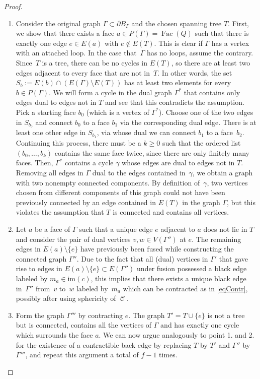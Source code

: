 \documentclass[10pt,a4paper]{amsart}
\DeclareMathOperator{\calc}{\mathcal{C}}
\DeclareMathOperator{\Fac}{\mathrm{Fac}}
\numberwithin{equation}{section}
\theoremstyle{definition}
\begin{document}
\begin{proof}
 \begin{enumerate}\itemsep=0pt
 \item Consider the original graph $\Gamma \subset \partial B_{\Gamma}$ and the chosen spanning tree $T$. First, we show that there exists a face $a \in P(\Gamma) =\Fac(Q)$ such that there is exactly one edge $e \in E(a)$ with $e \notin E(T)$. This is clear if $\Gamma$ has a vertex with an attached loop. In the case that~$\Gamma$ has no loops, assume the contrary. Since~$T$ is a tree, there can be no cycles in $E(T)$, so there are at least two edges adjacent to every face that are not in~$T$. In other words, the set $S_b := E(b) \cap \left(E(\Gamma)\setminus E(T)\right)$ has at least two elements for every $b \in P(\Gamma)$. We will form a cycle in the dual graph $\Gamma^*$ that contains only edges dual to edges not in $T$ and see that this contradicts the assumption. Pick a starting face $b_0$ (which is a vertex of $\Gamma^*$). Choose one of the two edges in $S_{b_0}$ and connect $b_0$ to a face $b_1$ via the corresponding dual edge. There is at least one other edge in $S_{b_1}$, via whose dual we can connect $b_1$ to a face~$b_2$. Continuing this process, there must be a $k \geq 0$ such that the ordered list $(b_0, \dots, b_k)$ contains the same face twice, since there are only finitely many faces. Then, $\Gamma^*$ contains a cycle $\gamma$ whose edges are dual to edges not in $T$. Removing all edges in $\Gamma$ dual to the edges contained in~$\gamma$, we obtain a graph with two nonempty connected components. By definition of~$\gamma$, two vertices chosen from different components of this graph could not have been previously connected by an edge contained in $E(T)$ in the graph $\Gamma$, but this violates the assumption that $T$ is connected and contains all vertices.
 \item Let $a$ be a face of $\Gamma$ such that a unique edge $e$ adjacent to $a$ does not lie in $T$ and consider the pair of dual vertices $v, w \in V(\Gamma'')$ at $e$. The remaining edges in $E(a)\setminus\{e\}$ have previously been fused while constructing the connected graph $\Gamma''$. Due to the fact that all (dual) vertices in $\Gamma'$ that gave rise to edges in $E(a)\setminus\{e\} \subset E(\Gamma'')$ under fusion possessed a black edge labeled by $m_a \in \mathrm{im}(c)$, this implies that there exists a unique black edge in~$\Gamma''$ from~$v$ to~$w$ labeled by~$m_a$ which can be contracted as in \eqref{eqContr}, possibly after using sphericity of $\calc$.
 \item Form the graph $\Gamma'''$ by contracting $e$. The graph $T' = T \cup \{e\}$ is not a tree but is connected, contains all the vertices of $\Gamma$ and has exactly one cycle which surrounds the face $a$. We can now argue analogously to point 1. and 2. for the existence of a contractible back edge by replacing $T$ by $T'$ and $\Gamma''$ by $\Gamma'''$, and repeat this argument a total of $f-1$ times.

\end{enumerate}
\end{proof}
\end{document}
